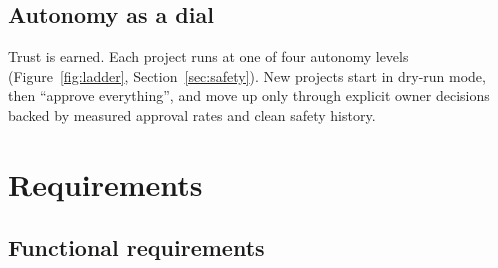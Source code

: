 \documentclass[11pt,a4paper]{article}
\begin{document}
\subsection{Autonomy as a dial}
Trust is earned. Each project runs at one of four autonomy levels (Figure~\ref{fig:ladder}, Section~\ref{sec:safety}). New projects start in dry-run mode, then ``approve everything'', and move up only through explicit owner decisions backed by measured approval rates and clean safety history.

\section{Requirements}

\subsection{Functional requirements}
\end{document}
